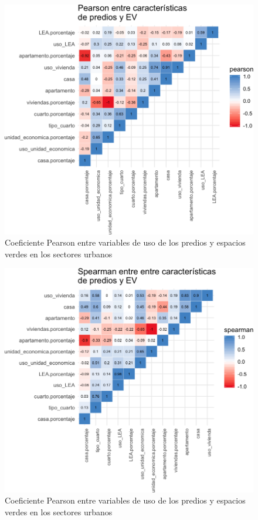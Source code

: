 \documentclass[12pt,]{book}
\begin{document}
\begin{figure}
\includegraphics[width=1\linewidth]{tesis-unigis_files/figure-latex/tile-prediosev-pearson-1} \caption{Coeficiente Pearson entre variables de uso de los predios
 y espacios verdes en los sectores urbanos}\label{fig:tile-prediosev-pearson}
\end{figure}

\begin{figure}
\includegraphics[width=1\linewidth]{tesis-unigis_files/figure-latex/tile-prediosev-spearman-1} \caption{Coeficiente Pearson entre variables de uso de los predios
 y espacios verdes en los sectores urbanos}\label{fig:tile-prediosev-spearman}
\end{figure}
\end{document}
